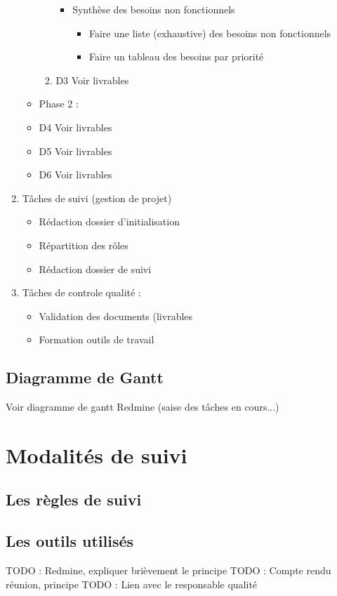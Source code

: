 \begin{enumerate}
\begin{itemize}
\begin{enumerate}
\begin{itemize}
	    	\item Synthèse des besoins non fonctionnels
	    	\begin{itemize}
				\item Faire une liste (exhaustive) des besoins non fonctionnels
				\item Faire un tableau des besoins par priorité
			\end{itemize}
	\end{itemize}
	    	
	\item D3 Voir livrables
	\end{enumerate}
	\item Phase 2 :	
	\item D4 Voir livrables
	\item D5 Voir livrables
	\item D6 Voir livrables
    
    \end{itemize}
    
\item Tâches de suivi (gestion de projet)
	\begin{itemize}
	\item Rédaction dossier d'initialisation
	\item Répartition des rôles
	\item Rédaction dossier de suivi
	
	\end{itemize}
	
\item Tâches de controle qualité :
\begin{itemize}
    \item Validation des documents (livrables
	\item Formation outils de travail
\end{itemize}	
\end{enumerate}
\subsection{Diagramme de Gantt}
Voir diagramme de gantt Redmine (saise des tâches en cours...)
\section{Modalités de suivi}
\subsection{Les règles de suivi}
\subsection{Les outils utilisés}
TODO : Redmine, expliquer brièvement le principe
TODO : Compte rendu réunion, principe 
TODO : Lien avec le responsable qualité
